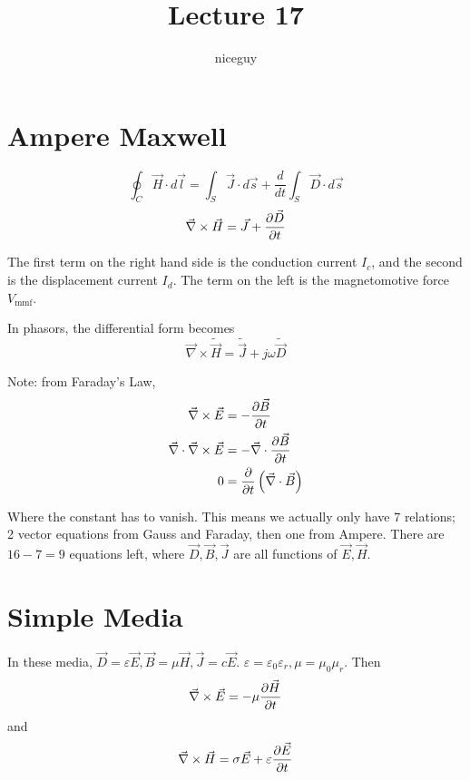 \documentclass[12pt]{article}
\title{Lecture 17}
\author{niceguy}
\begin{document}
\maketitle

\section{Ampere Maxwell}

$$\oint_C \vec H \cdot d\vec l = \int_S \vec J \cdot d\vec s + \frac{d}{dt}\int_S \vec D \cdot d\vec s$$
$$\vec\nabla \times \vec H = \vec J + \frac{\partial \vec D}{\partial t}$$

The first term on the right hand side is the conduction current $I_c$, and the second is the displacement current $I_d$. The term on the left is the magnetomotive force $V_{\text{mmf}}$.

In phasors, the differential form becomes
$$\vec\nabla \times \tilde{\vec H} = \tilde{\vec J} + j\omega\tilde{\vec D}$$

Note: from Faraday's Law,
\begin{align*}
    \vec\nabla \times \vec E &= -\frac{\partial \vec B}{\partial t} \\
    \vec\nabla \cdot \vec\nabla \times \vec E &= -\vec\nabla \cdot \frac{\partial \vec B}{\partial t} \\
    0 &= \frac{\partial }{\partial t} \left(\vec\nabla \cdot \vec B\right)
\end{align*}

Where the constant has to vanish. This means we actually only have 7 relations; 2 vector equations from Gauss and Faraday, then one from Ampere. There are $16 - 7 = 9$ equations left, where $\vec D, \vec B, \vec J$ are all functions of $\vec E, \vec H$.

\section{Simple Media}

In these media, $\vec D = \varepsilon\vec E, \vec B = \mu\vec H, \vec J = c\vec E$. $\varepsilon = \varepsilon_0\varepsilon_r, \mu = \mu_0\mu_r$. Then
$$\vec\nabla \times \vec E = -\mu\frac{\partial \vec H}{\partial t}$$
and
$$\vec\nabla \times \vec H = \sigma\vec E + \varepsilon\frac{\partial \vec E}{\partial t}$$
\end{document}
